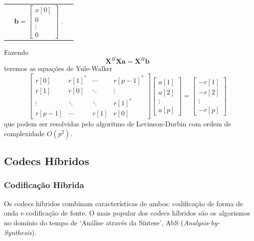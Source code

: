 \begin{frame}[allowframebreaks]
\begin{scriptsize}
\begin{tabular}{ccc}
  &

  $\mathbf{b} = \left[ \begin{array}{c}
  x[0] \\
  0 \\
  \vdots \\
  0 \end{array} \right] $  .
  \end{tabular}
  \end{scriptsize}

  \framebreak
  Fazendo
  \begin{equation}
  \mathbf{X}^H \mathbf{X} \mathbf{a} = \mathbf{X}^H \mathbf{b}
  \end{equation}
  teremos as equações de Yule-Walker
  \begin{equation}
  \left[ \begin{array}{cccc}
  r[0]     & r[1]^\ast  & \cdots & r[p-1]^\ast \\
  r[1]     & r[0]       & \ddots & \vdots \\
  \vdots   & \ddots     & \ddots & r[1]^\ast  \\
  r[p-1]   & \cdots     & r[1]   & r[0] 
  \end{array} \right]
  \left[ \begin{array}{c} a[1] \\ a[2] \\ \vdots \\ a[p] \end{array} \right]
  =
  \left[ \begin{array}{c} -r[1] \\ -r[2] \\ \vdots \\ -r[p] \end{array} \right]
  \end{equation}
  que podem ser resolvidas pelo algoritmo de Levinson-Durbin com ordem de complexidade $O(p^2)$.

\end{frame}




\subsection{Codecs Híbridos}
\begin{frame}
  \frametitle{Codificação Híbrida}
  Os codecs híbridos combinam características de ambos: codificação de forma de onda e codificação de fonte.
  O mais popular dos codecs híbridos são os algorismos no domínio do tempo de `Análise através da Síntese',
  AbS (\emph{Analysis-by-Synthesis}).
\end{frame}


